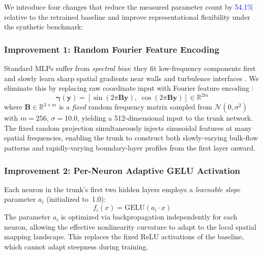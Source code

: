 \documentclass[journal]{IEEEtran}
\newcommand{\added}[1]{\textcolor{blue}{#1}}
\begin{document}
We introduce four changes that reduce the measured parameter count by \added{54.1\%} relative to the retrained baseline and improve representational flexibility under the synthetic benchmark:

\subsubsection{Improvement 1: Random Fourier Feature Encoding}
Standard MLPs suffer from \emph{spectral bias}: they fit low-frequency components first and slowly learn sharp spatial gradients near walls and turbulence interfaces \cite{rahaman2019spectral}. We eliminate this by replacing raw coordinate input with Fourier feature encoding \cite{tancik2020ffn}:
\begin{equation}
\bm{\gamma}(\bm{y}) = \left[\sin(2\pi \bm{B}\bm{y}),\;\cos(2\pi \bm{B}\bm{y})\right] \in \mathbb{R}^{2m}
\label{eq:fourier}
\end{equation}
where $\bm{B} \in \mathbb{R}^{3 \times m}$ is a \emph{fixed} random frequency matrix sampled from $\mathcal{N}(0, \sigma^2)$ with $m = 256$, $\sigma = 10.0$, yielding a 512-dimensional input to the trunk network. The fixed random projection simultaneously injects sinusoidal features at many spatial frequencies, enabling the trunk to construct both slowly-varying bulk-flow patterns and rapidly-varying boundary-layer profiles from the first layer onward.

\subsubsection{Improvement 2: Per-Neuron Adaptive GELU Activation}
Each neuron in the trunk's first two hidden layers employs a \emph{learnable slope} parameter $a_i$ (initialized to~1.0):
\begin{equation}
f_i(x) = \text{GELU}(a_i \cdot x)
\label{eq:adaptive_gelu}
\end{equation}
The parameter $a_i$ is optimized via backpropagation independently for each neuron, allowing the effective nonlinearity curvature to adapt to the local spatial mapping landscape. This replaces the fixed ReLU activations of the baseline, which cannot adapt steepness during training.
\end{document}
